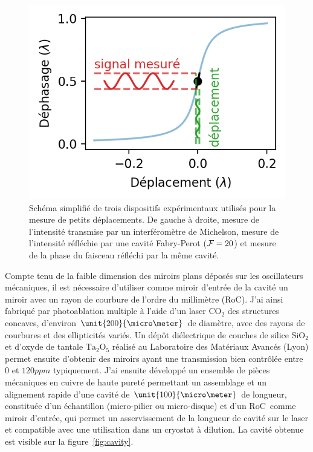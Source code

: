 \documentclass[12pt,a4paper]{article}
\newcommand{\uroc}{\micro RoC}
\begin{document}
\begin{figure}
\includegraphics[scale=0.75]{figures/cavity_phase_response.png}
\caption{Schéma simplifié de trois dispositifs expérimentaux utilisés pour la mesure de petits déplacements.
De gauche à droite, mesure de l'intensité transmise par un interféromètre de Michelson, mesure de l'intensité réfléchie par une cavité Fabry-Perot (${\cal{F}}=20$) et mesure de la phase du faisceau réfléchi par la même cavité.}
\label{fig:detection_scheme}
\end{figure}

Compte tenu de la faible dimension des miroirs plans déposés sur les oscillateurs mécaniques, il est nécessaire d'utiliser comme miroir d'entrée de la cavité un miroir avec un rayon de courbure de l'ordre du millimètre (\uroc).
J'ai ainsi fabriqué par photoablation multiple à l'aide d'un laser $\mathrm{CO_2}$ des structures concaves, d'environ $\unit{200}{\micro\meter}$ de diamètre, avec des rayons de courbures et des ellipticités variés.
Un dépôt diélectrique de couches de silice $\mathrm{SiO_2}$ et d'oxyde de tantale $\mathrm{Ta_2O_5}$ réalisé au Laboratoire des Matériaux Avancés (Lyon) permet ensuite d'obtenir des miroirs ayant une transmission bien contrôlée entre 0 et $\unit{120}{ppm}$ typiquement.
J'ai ensuite développé un ensemble de pièces mécaniques en cuivre de haute pureté permettant un assemblage et un alignement rapide d'une cavité de $\unit{100}{\micro\meter}$ de longueur, constituée d'un échantillon (micro-pilier ou micro-disque) et d'un \uroc\ comme miroir d'entrée, qui permet un asservissement de la longueur de cavité sur le laser et compatible avec une utilisation dans un cryostat à dilution.
La cavité obtenue est visible sur la figure~\ref{fig:cavity}.
\end{document}
